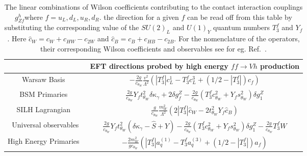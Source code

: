 \begin{table*}[!t]
\begin{center}
\small
\begin{tabular}{|c|c|}%
\hline
&EFT directions probed by high energy $ff \to Vh$ production \\
\hline
\hline
 Warsaw Basis~\cite{Grzadkowski:2010es} & $- \frac{2 g}{c_{\theta_W}}\frac{v^2}{\Lambda^2}(|T_3^f|c^{1}_L-T_3^f c^{3}_L+(1/2-|T_3^f|)c_f)$\\
BSM Primaries~\cite{Gupta:2014rxa} &$   \frac{2 g}{c_{\theta_W}}Y_f t_{\theta_W}^2 \delta \kappa_\gamma+2 \delta g^Z_{f}- \frac{2 g}{c_{\theta_W}}(T^f_3 c_{\theta_W}^2 + Y_f s_{\theta_W}^2)\delta g_1^Z $\\
 SILH Lagrangian~\cite{Giudice:2007fh} &$  \frac{g}{c_{\theta_W}}\frac{m_W^2}{\Lambda^2}(2 |T_3^f|\hat{c}_W-2t_{\theta_W}^2 Y_f \hat{c}_B)$\\
 Universal observables &$ \frac{2 g}{c_{\theta_W}}Y_f t_{\theta_W}^2  (\delta \kappa_\gamma-\hat{S}+Y)- \frac{2 g}{c_{\theta_W}}(T^f_3 c_{\theta_W}^2 + Y_f s_{\theta_W}^2)\delta g_1^Z- \frac{2 g}{c_{\theta_W}}T^f_3 W$\\
 High Energy Primaries~\cite{Franceschini:2017xkh} &$ -\frac{2 m_W^2}{g c_{\theta_W} }(|T_3^f| a_q^{(1)}-T_3^f a_q^{(3)}+(1/2-|T_3^f|)a_f)$\\
\hline
 \end{tabular}
  \caption{ The linear combinations of Wilson coefficients contributing to the contact interaction couplings $g^h_{Zf}$where  $f=u_L, d_L, u_R, d_R$. the direction for a given $f$  can  be read off from this table by substituting the corresponding  value of the $SU(2)_L$ and $U(1)_Y$ quantum numbers  $T_3^f$ and $Y_f$. Here $\hat{c}_W=c_W+c_{HW}-c_{2W}$ and $\hat{c}_B= c_B+c_{HB}-c_{2B}$. For the nomenclature of the operators, their corresponding Wilson coefficients and observables see for eg. Ref.~\cite{Franceschini:2017xkh}.}
  \label{dirn}
\end{center}
\end{table*}


